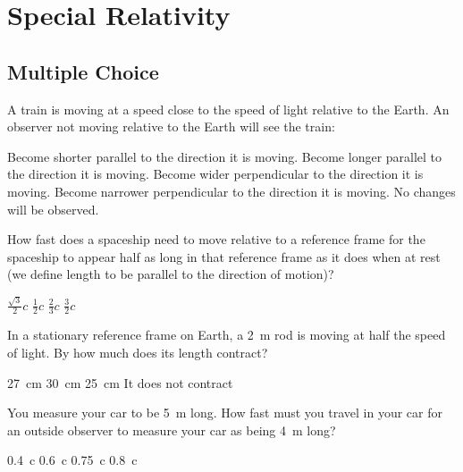 \section{Special Relativity}

\subsection{Multiple Choice}

\question A train is moving at a speed close to the speed of light relative to the Earth. An observer not moving relative to the Earth will see the train:
\begin{checkboxes}
\CorrectChoice Become shorter parallel to the direction it is moving. \correct
\choice Become longer parallel to the direction it is moving.
\choice Become wider perpendicular to the direction it is moving.
\choice Become narrower perpendicular to the direction it is moving.
\choice No changes will be observed.
\end{checkboxes}

\question How fast does a spaceship need to move relative to a reference frame for the spaceship to appear half as long in that reference frame as it does when at rest (we define length to be parallel to the direction of motion)?
\begin{checkboxes}
	\CorrectChoice $\frac{\sqrt 3}{2}c$
	\choice $\frac{1}{2}c$
	\choice $\frac{2}{3}c$
	\choice $\frac{3}{2}c$
\end{checkboxes}

\question In a stationary reference frame on Earth, a \SI{2}{m} rod is moving at half the speed of light. By how much does its length contract?
\begin{checkboxes}
\CorrectChoice \SI{27}{cm} \correct
\choice \SI{30}{cm}
\choice \SI{25}{cm}
\choice It does not contract
\end{checkboxes}

\question You measure your car to be \SI{5}{m} long.  How fast must you travel in your car for an outside observer to measure your car as being \SI{4}{m} long? 
\begin{choices} 

\choice \SI{0.4}{c}
\CorrectChoice \SI{0.6}{c} \correct
\choice \SI{0.75}{c}
\choice \SI{0.8}{c}
\end{choices}

